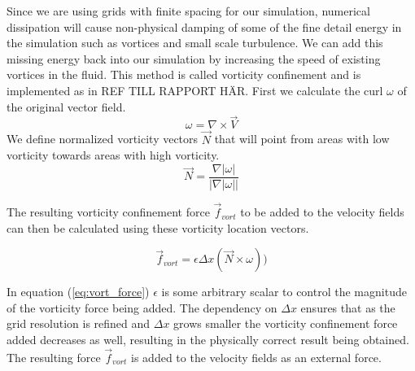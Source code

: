 Since we are using grids with finite spacing for our simulation, numerical dissipation will cause non-physical damping of some of the fine detail energy in the simulation such as vortices and small scale turbulence. We can add this missing energy back into our simulation by increasing the speed of existing vortices in the fluid. This method is called vorticity confinement and is implemented as in REF TILL RAPPORT HÄR. First we calculate the curl $\omega$ of the original vector field.
\begin{equation}
\label{eq:vorticity}
\omega = \nabla \times \vec{V}
\end{equation}
We define normalized vorticity vectors $\vec{N}$ that will point from areas with low vorticity towards areas with high vorticity.
\begin{equation}
\label{eq:vort_loc_vec}
\vec{N} = \frac{\nabla |\omega|}{|\nabla |\omega ||}
\end{equation}

The resulting vorticity confinement force $\vec{f}_{vort}$ to be added to the velocity fields can then be calculated using these vorticity location vectors.

\begin{equation}
\label{eq:vort_force}
	\vec{f}_{vort} = \epsilon\Delta x(\vec{N}\times\omega))
\end{equation}

In equation (\ref{eq:vort_force}) $\epsilon$ is some arbitrary scalar to control the magnitude of the vorticity force being added. The dependency on $\Delta x$ ensures that as the grid resolution is refined and $\Delta x$ grows smaller the vorticity confinement force added decreases as well, resulting in the physically correct result being obtained. The resulting force $\vec{f}_{vort}$ is added to the velocity fields as an external force.